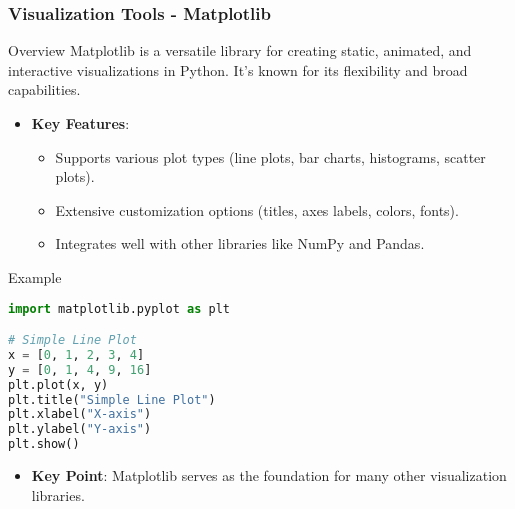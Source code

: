 \documentclass[aspectratio=169]{beamer}
\begin{document}
\begin{frame}[fragile]
    \frametitle{Visualization Tools - Matplotlib}
    \begin{block}{Overview}
        Matplotlib is a versatile library for creating static, animated, and interactive visualizations in Python. It's known for its flexibility and broad capabilities.
    \end{block}

    \begin{itemize}
        \item \textbf{Key Features}:
        \begin{itemize}
            \item Supports various plot types (line plots, bar charts, histograms, scatter plots).
            \item Extensive customization options (titles, axes labels, colors, fonts).
            \item Integrates well with other libraries like NumPy and Pandas.
        \end{itemize}
    \end{itemize}

    \begin{block}{Example}
        \begin{lstlisting}[language=Python]
import matplotlib.pyplot as plt

# Simple Line Plot
x = [0, 1, 2, 3, 4]
y = [0, 1, 4, 9, 16]
plt.plot(x, y)
plt.title("Simple Line Plot")
plt.xlabel("X-axis")
plt.ylabel("Y-axis")
plt.show()
        \end{lstlisting}
    \end{block}

    \begin{itemize}
        \item \textbf{Key Point}: Matplotlib serves as the foundation for many other visualization libraries.
    \end{itemize}
\end{frame}
\end{document}
